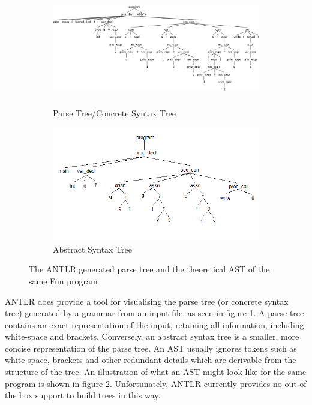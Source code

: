 \documentclass{l4proj}
\begin{document}
\begin{figure}[h]
	\begin{subfigure}[b]{0.5\textwidth}
		\includegraphics[height=5cm,width=\linewidth]{images/2-2a.png}
		\caption{Parse Tree/Concrete Syntax Tree}
		\label{fig:ANTLR-parse-tree}
	\end{subfigure}
	\begin{subfigure}[b]{0.5\textwidth}
		\includegraphics[height=5cm,width=\linewidth]{images/2-2b.png}
		\caption{Abstract Syntax Tree}
		\label{fig:ANTLR-syntax-tree}
	\end{subfigure}
	\caption{The ANTLR generated parse tree and the theoretical AST of the same Fun program}\label{fig:parse-abstract-tree}	
\end{figure}

ANTLR does provide a tool for visualising the parse tree (or concrete syntax tree) generated by a grammar from an input file, as seen in figure \ref{fig:ANTLR-parse-tree}. A parse tree contains an exact representation of the input, retaining all information, including white-space and brackets. Conversely, an abstract syntax tree is a smaller, more concise representation of the parse tree. An AST usually ignores tokens such as white-space, brackets and other redundant details which are derivable from the structure of the tree. An illustration of what an AST might look like for the same program is shown in figure \ref{fig:ANTLR-syntax-tree}. Unfortunately, ANTLR currently provides no out of the box support to build trees in this way.
\end{document}

